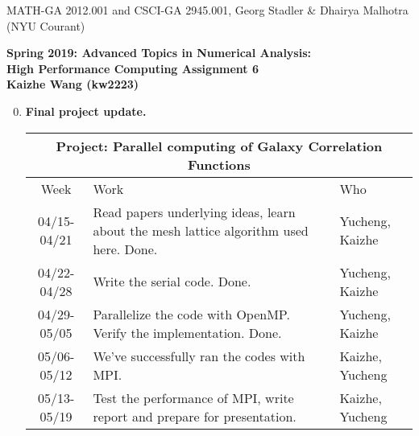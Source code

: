 \documentclass[12pt]{article}
\begin{document}
\begin{center}
  \vspace*{-2cm}
{\small MATH-GA 2012.001 and CSCI-GA 2945.001, Georg Stadler \&
  Dhairya Malhotra (NYU Courant)}
\end{center}
\vspace*{.5cm}
\begin{center}
\large \textbf{%
Spring 2019: Advanced Topics in Numerical Analysis: \\
High Performance Computing Assignment 6\\
Kaizhe Wang (kw2223) }
\end{center}

\begin{enumerate}
\setcounter{enumi}{-1}

  
\item {\bf Final project update.} 
  
   \begin{center}
  \begin{tabular} {|c|p{9cm}|p{2cm}|}
    \hline
    \multicolumn{3}{|c|}{\bf Project: Parallel computing of Galaxy Correlation Functions} \\
    \hline
    Week & Work & Who  \\ \hline \hline
    04/15-04/21 & Read papers underlying ideas, learn about the mesh lattice algorithm used here. Done. & Yucheng, Kaizhe \\ \hline
    04/22-04/28 & Write the serial code. Done. & Yucheng, Kaizhe \\ \hline
    04/29-05/05 & Parallelize the code with OpenMP. Verify the implementation. Done. & Yucheng, Kaizhe \\ \hline
    05/06-05/12 & We've successfully ran the codes with MPI. & Kaizhe, Yucheng \\ \hline
    05/13-05/19 & Test the performance of MPI, write report and prepare for presentation.  & Kaizhe, Yucheng \\ \hline
  \end{tabular}
  \end{center}


\end{enumerate}
\end{document}
